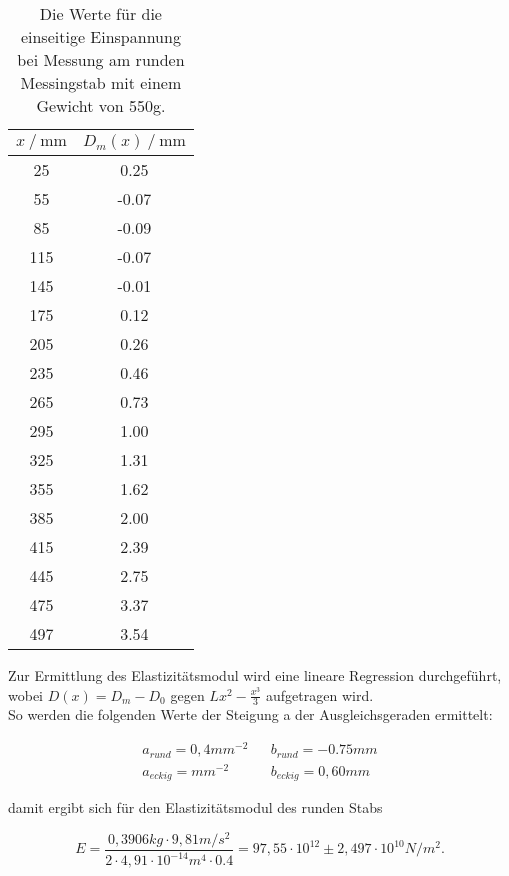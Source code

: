 \begin{table}[H]
  \centering
  \caption{Die Werte für die einseitige Einspannung bei Messung am runden Messingstab mit einem Gewicht von 550g.}
  \begin{tabular}{cc}
    \toprule
    {$x \mathbin{/} \unit{\milli\metre}$} &
    {$D_m(x) \mathbin{/} \unit{\milli\metre}$} \\
    \midrule
     25 &  0.25 \\
     55 & -0.07 \\
     85 & -0.09 \\
    115 & -0.07 \\
    145 & -0.01 \\
    175 & 0.12 \\
    205 & 0.26 \\ 
    235 & 0.46 \\
    265 & 0.73 \\
    295 & 1.00 \\
    325 & 1.31 \\
    355 & 1.62 \\
    385 & 2.00 \\
    415 & 2.39 \\
    445 & 2.75 \\
    475 & 3.37 \\
    497 & 3.54 \\
    
    \bottomrule
  \end{tabular}
  \label{tab:Tabelle2}
\end{table}

Zur Ermittlung des Elastizitätsmodul wird eine lineare Regression durchgeführt, wobei $D(x) = D_m - D_0$ gegen 
$Lx^2 - \frac{x^3}{3}$ aufgetragen wird.\\
So werden die folgenden Werte der Steigung a der Ausgleichsgeraden ermittelt:

\begin{align*} %
  a_{rund} = 0,4 mm^{-2} && b_{rund} = -0.75 mm \\
  a_{eckig} = mm^{-2} && b_{eckig} = 0,60 mm
\end{align*}

damit ergibt sich für den Elastizitätsmodul des runden Stabs

\begin{equation*}
  E = \frac{0,3906kg \cdot 9,81m/s^2}{2 \cdot 4,91\cdot 10^{-14} m^4 \cdot 0.4} = 97,55 \cdot 10^{12} \pm 2,497 \cdot 10^{10} N/m^2.
\end{equation*}


